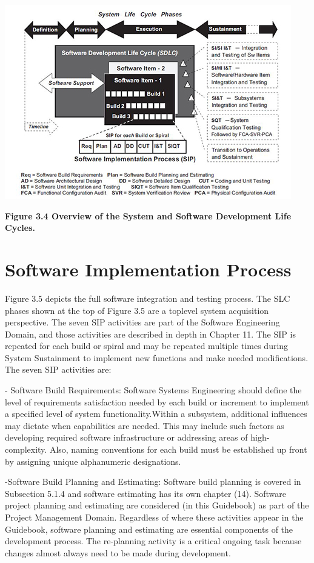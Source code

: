 \documentclass{book}
\begin{document}
\includegraphics{2.jpg}

\textbf{Figure 3.4 Overview of the System and Software Development Life Cycles.}

\section{Software Implementation Process}

Figure 3.5 depicts the full software integration and testing process. The SLC phases shown at the top of Figure 3.5 are a toplevel system acquisition perspective. The seven SIP activities are part of the Software Engineering Domain, and those activities are described in depth in Chapter 11. The SIP is repeated for each build or spiral and may be repeated multiple times during System Sustainment to implement new functions and make needed modifications. The seven SIP activities are:

- Software Build Requirements: Software Systems Engineering should define the level of requirements satisfaction needed by each build or increment to implement a specified level of system functionality.Within a subsystem, additional influences may dictate when capabilities are needed. This may include such factors as developing required software infrastructure or addressing areas of high-complexity. Also, naming conventions for each build must be established up front by assigning unique alphanumeric designations.

-Software Build Planning and Estimating: Software build planning is covered in Subsection 5.1.4 and software estimating has its own chapter (14). Software project planning and estimating are considered (in this Guidebook) as part of the Project Management Domain. Regardless of where these activities appear in the Guidebook, software planning and estimating are essential components of the development process. The re-planning activity is a critical ongoing task because changes almost always need to be made during development.
\end{document}
